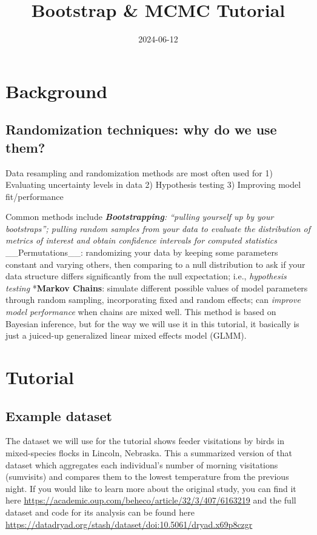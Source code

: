 \documentclass[
]{article}
\title{Bootstrap \& MCMC Tutorial}
\author{}
\date{\vspace{-2.5em}2024-06-12}
\begin{document}
\maketitle

\hypertarget{background}{%
\section{Background}\label{background}}

\hypertarget{randomization-techniques-why-do-we-use-them}{%
\subsection{Randomization techniques: why do we use
them?}\label{randomization-techniques-why-do-we-use-them}}

Data resampling and randomization methods are most often used for 1)
Evaluating uncertainty levels in data 2) Hypothesis testing 3) Improving
model fit/performance

Common methods include \emph{\textbf{Bootstrapping}: ``pulling yourself
up by your bootstraps''; pulling random samples from your data to
\emph{evaluate} the distribution of metrics of interest and obtain
\emph{confidence intervals} for computed statistics
}\_\_Permutations\_\_: randomizing your data by keeping some parameters
constant and varying others, then comparing to a null distribution to
ask if your data structure differs significantly from the null
expectation; i.e., \emph{hypothesis testing} *\textbf{Markov Chains}:
simulate different possible values of model parameters through random
sampling, incorporating fixed and random effects; can \emph{improve
model performance} when chains are mixed well. This method is based on
Bayesian inference, but for the way we will use it in this tutorial, it
basically is just a juiced-up generalized linear mixed effects model
(GLMM).

\hypertarget{tutorial}{%
\section{Tutorial}\label{tutorial}}

\hypertarget{example-dataset}{%
\subsection{Example dataset}\label{example-dataset}}

The dataset we will use for the tutorial shows feeder visitations by
birds in mixed-species flocks in Lincoln, Nebraska. This a summarized
version of that dataset which aggregates each individual's number of
morning visitations (sumvisits) and compares them to the lowest
temperature from the previous night. If you would like to learn more
about the original study, you can find it here
\url{https://academic.oup.com/beheco/article/32/3/407/6163219} and the
full dataset and code for its analysis can be found here
\url{https://datadryad.org/stash/dataset/doi:10.5061/dryad.x69p8czgr}
\end{document}
